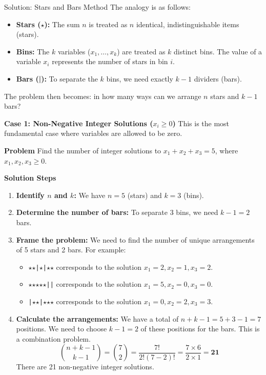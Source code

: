\begin{solutionboxbreak}{Solution: Stars and Bars Method}
    The analogy is as follows:
\begin{itemize}
    \item \textbf{Stars ($\star$):} The sum $n$ is treated as $n$ identical, indistinguishable items (stars).
    \item \textbf{Bins:} The $k$ variables ($x_1, \dots, x_k$) are treated as $k$ distinct bins. The value of a variable $x_i$ represents the number of stars in bin $i$.
    \item \textbf{Bars (|):} To separate the $k$ bins, we need exactly $k-1$ dividers (bars).
\end{itemize}
The problem then becomes: in how many ways can we arrange $n$ stars and $k-1$ bars?


\textbf{Case 1: Non-Negative Integer Solutions ($x_i \ge 0$)}
This is the most fundamental case where variables are allowed to be zero.

\textbf{Problem}
Find the number of integer solutions to $x_1 + x_2 + x_3 = 5$, where $x_1, x_2, x_3 \ge 0$.

\textbf{Solution Steps}
\begin{enumerate}
    \item \textbf{Identify $n$ and $k$:} We have $n=5$ (stars) and $k=3$ (bins).
    
    \item \textbf{Determine the number of bars:} To separate 3 bins, we need $k-1 = 2$ bars.
    
    \item \textbf{Frame the problem:} We need to find the number of unique arrangements of 5 stars and 2 bars. For example:
    \begin{itemize}
        \item \texttt{$\star$$\star$|$\star$|$\star$$\star$} corresponds to the solution $x_1=2, x_2=1, x_3=2$.
        \item \texttt{$\star$$\star$$\star$$\star$$\star$||} corresponds to the solution $x_1=5, x_2=0, x_3=0$.
        \item \texttt{|$\star$$\star$|$\star$$\star$$\star$} corresponds to the solution $x_1=0, x_2=2, x_3=3$.
    \end{itemize}
    
    \item \textbf{Calculate the arrangements:} We have a total of $n+k-1 = 5+3-1=7$ positions. We need to choose $k-1=2$ of these positions for the bars. This is a combination problem.
    \[
    \binom{n+k-1}{k-1} = \binom{7}{2} = \frac{7!}{2!(7-2)!} = \frac{7 \times 6}{2 \times 1} = \mathbf{21}
    \]
    There are 21 non-negative integer solutions.
\end{enumerate}


\end{solutionboxbreak}

